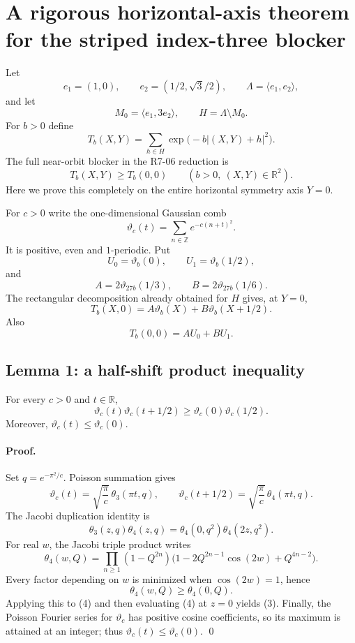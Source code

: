 
\section*{A rigorous horizontal-axis theorem for the striped index-three blocker}

Let
\[
 e_1=(1,0),\qquad e_2=(1/2,\sqrt3/2),\qquad
 \Lambda=\langle e_1,e_2\rangle,
\]
and let
\[
 M_0=\langle e_1,3e_2\rangle,\qquad
 H=\Lambda\setminus M_0.
\]
For $b>0$ define
\[
 T_b(X,Y)=\sum_{h\in H}\exp\bigl(-b\lvert (X,Y)+h\rvert^2\bigr).
\]
The full near-orbit blocker in the R7-06 reduction is
\[
 T_b(X,Y)\ge T_b(0,0)\qquad (b>0,\ (X,Y)\in\mathbb R^2).
\]
Here we prove this completely on the entire horizontal symmetry axis $Y=0$.

For $c>0$ write the one-dimensional Gaussian comb
\[
 \vartheta_c(t)=\sum_{n\in\mathbb Z}e^{-c(n+t)^2}.
\]
It is positive, even and $1$-periodic.  Put
\[
 U_0=\vartheta_b(0),\qquad U_1=\vartheta_b(1/2),
\]
and
\[
 A=2\vartheta_{27b}(1/3),\qquad
 B=2\vartheta_{27b}(1/6).
\]
The rectangular decomposition already obtained for $H$ gives, at $Y=0$,
\[
 \boxed{T_b(X,0)=A\vartheta_b(X)+B\vartheta_b(X+1/2).}\tag{1}
\]
Also
\[
 T_b(0,0)=A U_0+B U_1.\tag{2}
\]

\subsection*{Lemma 1: a half-shift product inequality}
For every $c>0$ and $t\in\mathbb R$,
\[
 \boxed{\vartheta_c(t)\vartheta_c(t+1/2)
 \ge \vartheta_c(0)\vartheta_c(1/2).}\tag{3}
\]
Moreover, $\vartheta_c(t)\le\vartheta_c(0)$.

\paragraph{Proof.}
Set $q=e^{-\pi^2/c}$.  Poisson summation gives
\[
 \vartheta_c(t)=\sqrt{\frac\pi c}\,\theta_3(\pi t,q),\qquad
 \vartheta_c(t+1/2)=\sqrt{\frac\pi c}\,\theta_4(\pi t,q).
\]
The Jacobi duplication identity is
\[
 \theta_3(z,q)\theta_4(z,q)
 =\theta_4(0,q^2)\theta_4(2z,q^2).\tag{4}
\]
For real $w$, the Jacobi triple product writes
\[
 \theta_4(w,Q)=\prod_{n\ge1}(1-Q^{2n})
 \bigl(1-2Q^{2n-1}\cos(2w)+Q^{4n-2}\bigr).
\]
Every factor depending on $w$ is minimized when $\cos(2w)=1$, hence
\[
 \theta_4(w,Q)\ge\theta_4(0,Q).
\]
Applying this to (4) and then evaluating (4) at $z=0$ yields (3).
Finally, the Poisson Fourier series for $\vartheta_c$ has positive cosine
coefficients, so its maximum is attained at an integer; thus
$\vartheta_c(t)\le\vartheta_c(0)$. \qed

